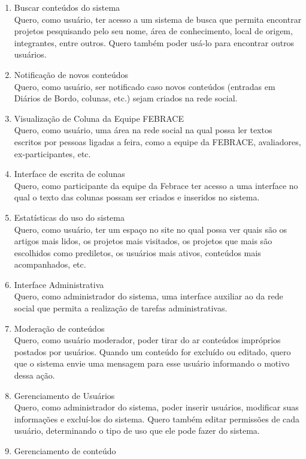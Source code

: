 \documentclass[a4paper,12pt,font=plain,header=plain]{abnt}
\begin{document}
\begin{enumerate}
	 \item Buscar conteúdos do sistema \\
		Quero, como usuário, ter acesso a  um sistema de busca que permita encontrar projetos pesquisando pelo seu nome, área de conhecimento, local de origem, integrantes, entre outros. Quero também poder usá-lo para encontrar outros usuários.
	 \item Notificação de novos conteúdos \\
		Quero, como usuário, ser notificado caso novos conteúdos (entradas em Diários de Bordo, colunas, etc.) sejam criados na rede social.
	 \item Visualização de Coluna da Equipe FEBRACE \\
		Quero, como usuário, uma área na rede social na qual possa ler textos escritos por pessoas ligadas a feira, como a equipe da FEBRACE, avaliadores, ex-participantes, etc.
	 \item Interface de escrita de colunas \\
                Quero, como participante da equipe da Febrace ter acesso a uma interface no qual o texto das colunas possam ser criados e inseridos no sistema.
	 \item Estatísticas do uso do sistema \\
		Quero, como usuário, ter um espaço no site no qual possa ver quais são os artigos mais lidos, os projetos mais visitados, os projetos que mais são escolhidos como prediletos, os usuários mais ativos, conteúdos mais acompanhados, etc.
	 \item Interface Administrativa \\
		Quero, como administrador do sistema, uma interface auxiliar ao da rede social que permita a realização de tarefas administrativas.
	 \item Moderação de conteúdos \\
		Quero, como usuário moderador, poder tirar do ar conteúdos impróprios postados por usuários. Quando um conteúdo for excluído ou editado, quero que o sistema envie uma mensagem para esse usuário informando o motivo dessa ação.
	 \item Gerenciamento de Usuários \\
		Quero, como administrador do sistema, poder inserir usuários, modificar suas informações e excluí-los do sistema. Quero também editar permissões de cada usuário, determinando o tipo de uso que ele pode fazer do sistema.
	 \item Gerenciamento de conteúdo \\

\end{enumerate}
\end{document}
